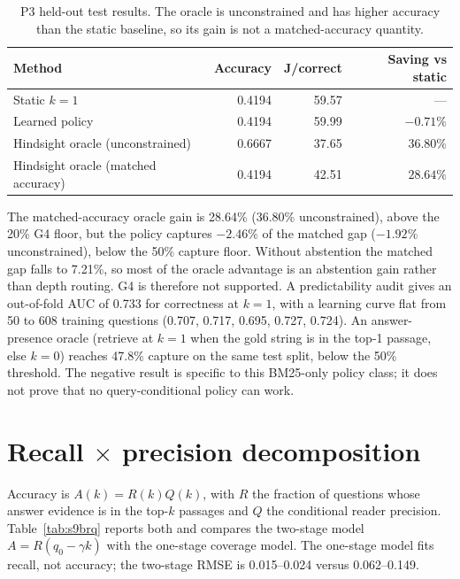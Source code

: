 \documentclass[a4paper,fleqn]{cas-sc}
\begin{document}
\begin{table}[pos=htbp]
  \centering
  \caption{P3 held-out test results. The oracle is unconstrained and has higher
  accuracy than the static baseline, so its gain is not a matched-accuracy
  quantity.}
  \label{tab:s9policy}
  \footnotesize
  \begin{tabular}{@{}lrrr@{}}
    \toprule
    \textbf{Method} & \textbf{Accuracy} & \textbf{J/correct} & \textbf{Saving vs static} \\
    \midrule
    Static $k=1$ & 0.4194 & 59.57 & — \\
    Learned policy & 0.4194 & 59.99 & $-0.71\%$ \\
    Hindsight oracle (unconstrained) & 0.6667 & 37.65 & $36.80\%$ \\
    Hindsight oracle (matched accuracy) & 0.4194 & 42.51 & $28.64\%$ \\
    \bottomrule
  \end{tabular}
\end{table}

The matched-accuracy oracle gain is 28.64\% (36.80\% unconstrained), above the
20\% G4 floor, but the policy captures $-2.46\%$ of the matched gap
($-1.92\%$ unconstrained), below the 50\% capture floor. Without abstention the
matched gap falls to 7.21\%, so most of the oracle advantage is an abstention
gain rather than depth routing. G4 is therefore not supported. A predictability audit gives an out-of-fold AUC
of 0.733 for correctness at $k=1$, with a learning curve flat from 50 to 608
training questions (0.707, 0.717, 0.695, 0.727, 0.724). An answer-presence
oracle (retrieve at $k=1$ when the gold string is in the top-1 passage, else
$k=0$) reaches 47.8\% capture on the same test split, below the 50\% threshold.
The negative result is specific to this BM25-only policy class; it does not
prove that no query-conditional policy can work.

\section{Recall $\times$ precision decomposition}\label{sec:s9b}

Accuracy is $A(k)=R(k)Q(k)$, with $R$ the fraction of questions whose answer
evidence is in the top-$k$ passages and $Q$ the conditional reader precision.
Table~\ref{tab:s9brq} reports both and compares the two-stage model
$A=R(q_0-\gamma k)$ with the one-stage coverage model. The one-stage model fits
recall, not accuracy; the two-stage RMSE is 0.015--0.024 versus 0.062--0.149.
\end{document}
